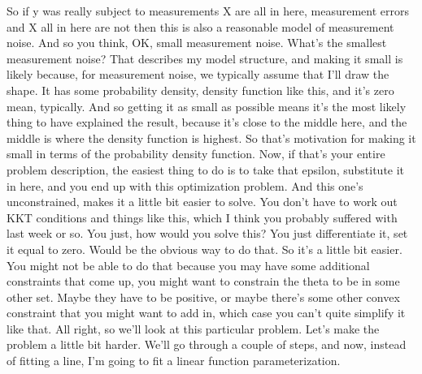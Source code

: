 \documentclass[11pt,a4paper]{article}
\begin{document}
So if y was really subject to measurements X are all in here, measurement errors and X all in here are not then this is also a reasonable model of measurement noise. And so you think, OK, small measurement noise. What's the smallest measurement noise? That describes my model structure, and making it small is likely because, for measurement noise, we typically assume that I'll draw the shape. It has some probability density, density function like this, and it's zero mean, typically. And so getting it as small as possible means it's the most likely thing to have explained the result, because it's close to the middle here, and the middle is where the density function is highest. So that's motivation for making it small in terms of the probability density function. Now, if that's your entire problem description, the easiest thing to do is to take that epsilon, substitute it in here, and you end up with this optimization problem. And this one's unconstrained, makes it a little bit easier to solve. You don't have to work out KKT conditions and things like this, which I think you probably suffered with last week or so. You just, how would you solve this? You just differentiate it, set it equal to zero. Would be the obvious way to do that. So it's a little bit easier. You might not be able to do that because you may have some additional constraints that come up, you might want to constrain the theta to be in some other set. Maybe they have to be positive, or maybe there's some other convex constraint that you might want to add in, which case you can't quite simplify it like that. All right, so we'll look at this particular problem. Let's make the problem a little bit harder. We'll go through a couple of steps, and now, instead of fitting a line, I'm going to fit a linear function parameterization.
\end{document}
